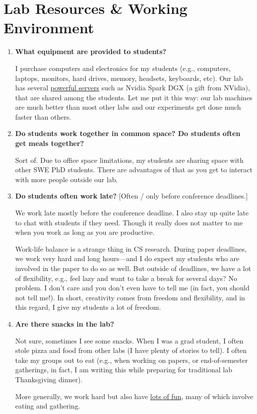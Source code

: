 \documentclass{article}
\begin{document}
\section{Lab Resources \& Working Environment}

\begin{enumerate}[label=\arabic*.]
    \item \textbf{What equipment are provided to students?}  
    
    I purchase computers and electronics for my students (e.g., computers, laptops, monitors, hard drives, memory, headsets, keyboards, etc). Our lab has several \href{https://github.com/dynaroars/dynaroars.github.io/wiki/Servers}{powerful servers} such as Nvidia Spark DGX (a gift from NVidia), that are shared among the students.  
    Let me put it this way: our lab machines are much better than most other labs and our experiments get done much faster than others.

    \item \textbf{Do students work together in common space? Do students often get meals together?}  
    
    Sort of. Due to office space limitations, my students are sharing space with other SWE PhD students. There are advantages of that as you get to interact with more people outside our lab.

    \item \textbf{Do students often work late?} [Often / only before conference deadlines.]  
    
    We work late mostly before the conference deadline. I also stay up quite late to chat with students if they need. Though it really does not matter to me when you work as long as you are productive.

    Work-life balance is a strange thing in CS research. During paper deadlines, we work very hard and long hours---and I do expect my students who are involved in the paper to do so as well. But outside of deadlines, we have a lot of flexibility, e.g., feel lazy and want to take a break for several days? No problem. I don't care and you don't even have to tell me (in fact, you should not tell me!). In short, creativity comes from freedom and flexibility, and in this regard, I give my students a lot of freedom.



    \item \textbf{Are there snacks in the lab?}  
    
    Not sure, sometimes I see some snacks. When I was a grad student, I often stole pizza and food from other labs (I have plenty of stories to tell). I often take my groups out to eat (e.g., when working on papers, or end-of-semester gatherings, in fact, I am writing this while preparing for traditional lab Thanksgiving dinner).  
    
    More generally, we work hard but also have \href{https://photos.google.com/share/AF1QipNMHIvnSmq5bjer6I6r1Ddb4yiBt3jgq4yrA7q5lSmo4ePHfmiXhXqhk8IhKf47lA?key=SkJhMjZtYmoyT1Q2aW1ERGpRa2VTclZrbzJVLUpR}{lots of fun}, many of which involve eating and gathering.
\end{enumerate}
\end{document}
